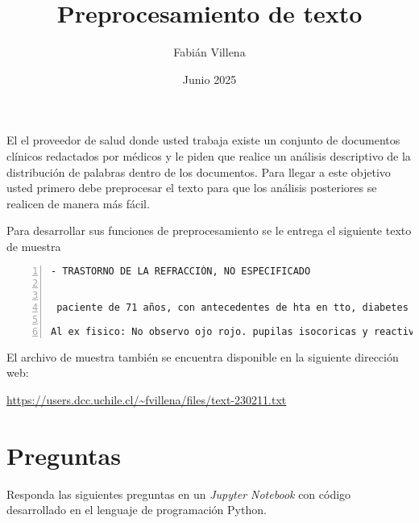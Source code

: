 \documentclass{article}
\title{Preprocesamiento de texto}
\author{Fabián Villena}
\date{Junio 2025}
\begin{document}
\maketitle

El el proveedor de salud donde usted trabaja existe un conjunto de documentos clínicos redactados por médicos y le piden que realice un análisis descriptivo de la distribución de palabras dentro de los documentos. Para llegar a este objetivo usted primero debe preprocesar el texto para que los análisis posteriores se realicen de manera más fácil.

Para desarrollar sus funciones de preprocesamiento se le entrega el siguiente texto de muestra

\begin{lstlisting}[breaklines=true, extendedchars=true,numbers=left,frame=single]
- TRASTORNO DE LA REFRACCIÓN, NO ESPECIFICADO


 paciente de 71 años, con antecedentes de hta en tto, diabetes insulinodependiente, dislipidemia, hipotiroidismo en tto, enfermedad renal cronica etapa iii,tabaquismo cronico importante, en febrero de este año lo suspendio. Refiere que tiene principios de Alzheimer y parkinson?????? NO SALE REGISTRO DE DIAGNOSTICOS. Refiere que necesita ic a oftalmologo. Tiene astigmatismo y miopia, ocupa lentes para ambos trastornos de viciorefraccion, refiere que hace 4 meses que ve borroso utilizando lentes ópticos.  Fue operada hace mas de 2 años por retinopatia diabetica en ambos ojos. 

Al ex fisico: No observo ojo rojo. pupilas isocoricas y reactivas. no observo opacidades corneales. RFM presente. agudeza visual conservada.
\end{lstlisting}

El archivo de muestra también se encuentra disponible en la siguiente dirección web:

\begin{center}
	\url{https://users.dcc.uchile.cl/~fvillena/files/text-230211.txt}
\end{center}

\section*{Preguntas}

Responda las siguientes preguntas en un \textit{Jupyter Notebook} con código desarrollado en el lenguaje de programación Python.
\end{document}
